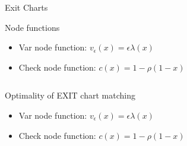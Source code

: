 \documentclass[10pt,xcolor=table]{beamer}
\begin{document}
\begin{frame}{Exit Charts}
\begin{block}{Node functions}
\begin{itemize}
\item Var node function: $v_{\epsilon}(x) = \epsilon \lambda(x)$
\item Check node function: $c(x) = 1- \rho(1-x)$
\end{itemize}
\end{block}
\begin{columns}
\begin{column}{0.47\textwidth}
\begin{center}
\scalebox{0.35}{}
\end{center}
\end{column}

\begin{column}{0.47\textwidth}
\begin{center}
\scalebox{0.35}{}
\end{center}

\end{column}

\end{columns}
\end{frame}
\begin{frame}{Optimality of EXIT chart matching}
\begin{itemize}
\item Var node function: $v_{\epsilon}(x) = \epsilon \lambda(x)$
\item Check node function: $c(x) = 1- \rho(1-x)$
\end{itemize}
\begin{center}
\scalebox{0.45}{}
\end{center}
\end{frame}
\end{document}
